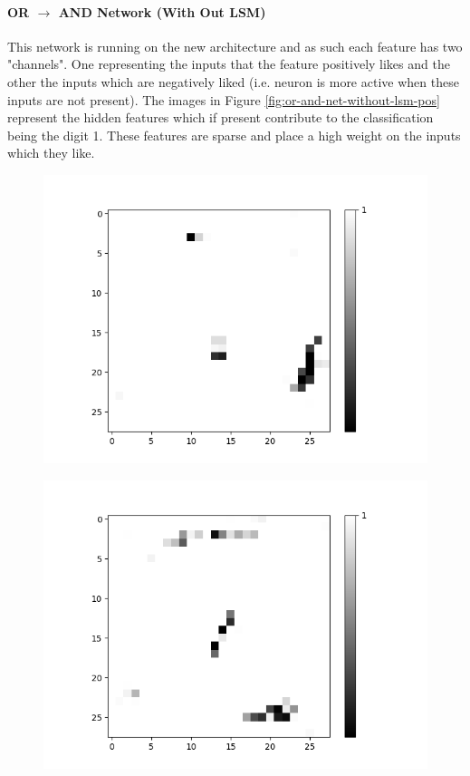 \paragraph{OR $\rightarrow$ AND Network (With Out LSM)}
This network is running on the new architecture and as such each feature has two "channels". One representing the inputs that the feature positively likes and the other the inputs which are negatively liked (i.e. neuron is more active when these inputs are not present). The images in Figure \ref{fig:or-and-net-without-lsm-pos} represent the hidden features which if present contribute to the classification being the digit 1. These features are sparse and place a high weight on the inputs which they like.

\begin{figure}[H]
	\centering
	\begin{minipage}[b]{0.19\textwidth}
		\captionsetup{labelformat=empty}
		\includegraphics[width=\textwidth]{OR-AND(WO-LSM)(1)/Like/True/Layer0-Neuron-0.png}
		\label{}
	\end{minipage}
	\begin{minipage}[b]{0.19\textwidth}
		\captionsetup{labelformat=empty}
		\includegraphics[width=\textwidth]{OR-AND(WO-LSM)(1)/Like/True/Layer0-Neuron-3.png}

\end{minipage}
\end{figure}
